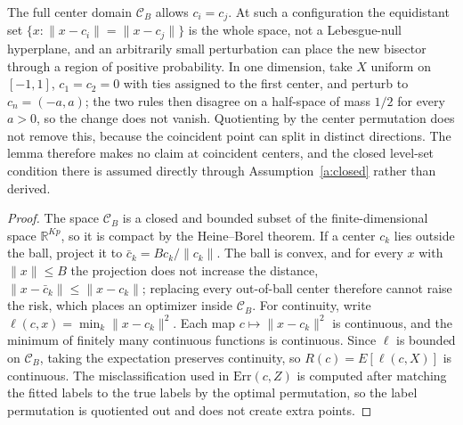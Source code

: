 \begin{remark}\label{rem:coincident}
The full center domain $\mathcal C_B$ allows $c_i=c_j$. At such a configuration the equidistant set $\{x:\|x-c_i\|=\|x-c_j\|\}$ is the whole space, not a Lebesgue-null hyperplane, and an arbitrarily small perturbation can place the new bisector through a region of positive probability. In one dimension, take $X$ uniform on $[-1,1]$, $c_1=c_2=0$ with ties assigned to the first center, and perturb to $c_n=(-a,a)$; the two rules then disagree on a half-space of mass $1/2$ for every $a>0$, so the change does not vanish. Quotienting by the center permutation does not remove this, because the coincident point can split in distinct directions. The lemma therefore makes no claim at coincident centers, and the closed level-set condition there is assumed directly through Assumption~\ref{a:closed} rather than derived.
\end{remark}

\begin{proof}
The space $\mathcal C_B$ is a closed and bounded subset of the finite-dimensional space $\mathbb R^{Kp}$, so it is compact by the Heine–Borel theorem. If a center $c_k$ lies outside the ball, project it to $\bar c_k=Bc_k/\|c_k\|$. The ball is convex, and for every $x$ with $\|x\|\le B$ the projection does not increase the distance, $\|x-\bar c_k\|\le\|x-c_k\|$; replacing every out-of-ball center therefore cannot raise the risk, which places an optimizer inside $\mathcal C_B$. For continuity, write $\ell(c,x)=\min_k\|x-c_k\|^2$. Each map $c\mapsto\|x-c_k\|^2$ is continuous, and the minimum of finitely many continuous functions is continuous. Since $\ell$ is bounded on $\mathcal C_B$, taking the expectation preserves continuity, so $R(c)=E[\ell(c,X)]$ is continuous. The misclassification used in $\mathrm{Err}(c,Z)$ is computed after matching the fitted labels to the true labels by the optimal permutation, so the label permutation is quotiented out and does not create extra points.
\end{proof}
